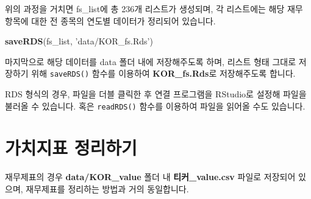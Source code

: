 \documentclass[12pt,]{book}
\newenvironment{Shaded}{\begin{snugshade}}{\end{snugshade}}
\newcommand{\ControlFlowTok}[1]{\textcolor[rgb]{0.13,0.29,0.53}{\textbf{#1}}}
\newcommand{\DataTypeTok}[1]{\textcolor[rgb]{0.13,0.29,0.53}{#1}}
\newcommand{\DecValTok}[1]{\textcolor[rgb]{0.00,0.00,0.81}{#1}}
\newcommand{\KeywordTok}[1]{\textcolor[rgb]{0.13,0.29,0.53}{\textbf{#1}}}
\newcommand{\NormalTok}[1]{#1}
\newcommand{\OperatorTok}[1]{\textcolor[rgb]{0.81,0.36,0.00}{\textbf{#1}}}
\newcommand{\StringTok}[1]{\textcolor[rgb]{0.31,0.60,0.02}{#1}}
\begin{document}
위의 과정을 거치면 fs\_list에 총 236개 리스트가 생성되며, 각 리스트에는 해당 재무 항목에 대한 전 종목의 연도별 데이터가 정리되어 있습니다.

\begin{Shaded}
\begin{Highlighting}[]
\KeywordTok{saveRDS}\NormalTok{(fs_list, }\StringTok{'data/KOR_fs.Rds'}\NormalTok{)}
\end{Highlighting}
\end{Shaded}

마지막으로 해당 데이터를 data 폴더 내에 저장해주도록 하며, 리스트 형태 그대로 저장하기 위해 \texttt{saveRDS()} 함수를 이용하여 \textbf{KOR\_fs.Rds}로 저장해주도록 합니다.

RDS 형식의 경우, 파일을 더블 클릭한 후 연결 프로그램을 RStudio로 설정해 파일을 불러올 수 있습니다. 혹은 \texttt{readRDS()} 함수를 이용하여 파일을 읽어올 수도 있습니다.

\hypertarget{section-37}{%
\section{가치지표 정리하기}\label{section-37}}

재무제표의 경우 \textbf{data/KOR\_value} 폴더 내 \textbf{티커\_value.csv} 파일로 저장되어 있으며, 재무제표를 정리하는 방법과 거의 동일합니다.

\begin{Shaded}
\end{Shaded}
\end{document}
